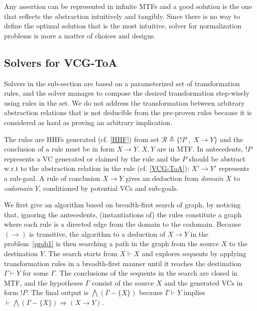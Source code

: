 Any assertion can be represented in infinite MTFs and a good solution is the one that reflects the abstraction intuitively and tangibly.
Since there is no way to define the optimal solution that is the most intuitive, solver for normalization problems is more a matter of choices and designs.


\subsection{Solvers for VCG-ToA}\label{solve-VCG-ToA}

Solvers in the sub-section are based on a parameterized set of transformation rules, and the solver manages to compose the desired transformation step-wisely using rules in the set.
We do not address the transformation between arbitrary abstraction relations that is not deducible from the pre-proven rules because it is considered as hard as proving an arbitrary implication.

The rules are HHFs generated (cf. \cref{HHF}) from set $\mathcal{R} \triangleq \{!P\;,\; X \longrightarrow Y\}$ and the conclusion of a rule must be in form $X \longrightarrow Y$. $X,Y$ are in MTF.
In antecedents, $!P$ represents a VC generated or claimed by the rule and the $P$ should be abstract w.r.t to the abstraction relation in the rule (cf. \cref{VCG-ToA}); $X' \longrightarrow Y'$ represents a sub-goal.
A rule of conclusion $X \longrightarrow Y$ gives an deduction from \emph{domain} $X$ to \emph{codomain} $Y$, conditioned by potential VCs and sub-goals.


We first give an algorithm based on breadth-first search of graph, by noticing that, ignoring the antecedents, (instantiations of) the rules constitute a graph where each rule is a directed edge from the domain to the codomain.
Because $(\longrightarrow)$ is transitive, the algorithm to a deduction of $X \longrightarrow Y$ in the problem~\ref{prob1} is then searching a path in the graph from the source $X$ to the destination $Y$.
The search starts from $X \vdash X$ and explores sequents by applying transformation rules in a breadth-first manner until it reaches the destination $\Gamma \vdash Y$ for some $\Gamma$.
The conclusions of the sequents in the search are closed in MTF, and the hypotheses $\Gamma$ consist of the source $X$ and the generated VCs in form $!P$. The final output is $\bigwedge (\Gamma - \{X\})$ because $\Gamma \vdash Y$ implies $\vdash \bigwedge (\Gamma - \{X\}) \Longrightarrow (X \longrightarrow Y)$.

